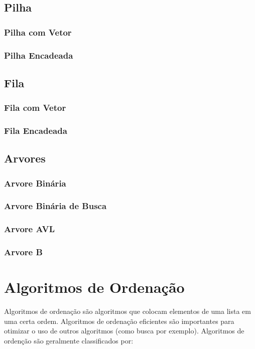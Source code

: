\documentclass[10pt,a4paper]{article}
\begin{document}
\subsection{Pilha}
\subsubsection{Pilha com Vetor}
\subsubsection{Pilha Encadeada}

\subsection{Fila}
\subsubsection{Fila com Vetor}
\subsubsection{Fila Encadeada}

\subsection{Arvores}
\subsubsection{Arvore Binária}
\subsubsection{Arvore Binária de Busca}
\subsubsection{Arvore AVL}
\subsubsection{Arvore B}


\section{Algoritmos de Ordenação}
Algoritmos de ordenação são algoritmos que colocam elementos de uma lista em uma certa ordem. Algoritmos de ordenação eficientes são importantes para otimizar o uso de outros algoritmos (como busca por exemplo). Algoritmos de ordenção são geralmente  classificados por:
\end{document}
